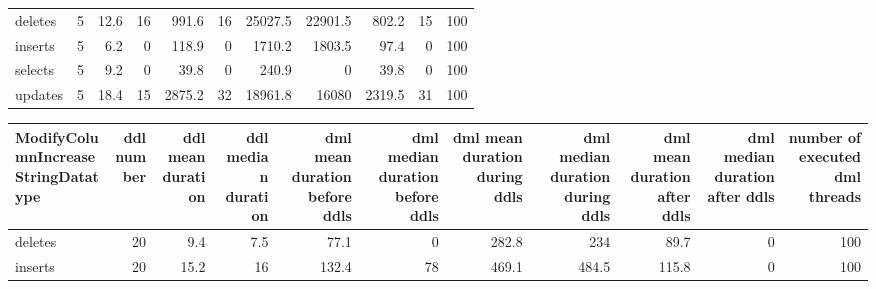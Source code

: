 \begin{tabular}{lrrrrrrrrrr}
\hline
 deletes     &            5 &                12.6 &                    16 &                           991.6 &                                16 &                         25027.5 &                           22901.5 &                          802.2 &                               15 &                              100 \\
 inserts     &            5 &                 6.2 &                     0 &                           118.9 &                                 0 &                          1710.2 &                            1803.5 &                           97.4 &                                0 &                              100 \\
 selects     &            5 &                 9.2 &                     0 &                            39.8 &                                 0 &                           240.9 &                               0   &                           39.8 &                                0 &                              100 \\
 updates     &            5 &                18.4 &                    15 &                          2875.2 &                                32 &                         18961.8 &                           16080   &                         2319.5 &                               31 &                              100 \\
\hline
\end{tabular}\begin{tabular}{lrrrrrrrrrr}
\hline
 ModifyColumnIncreaseStringDatatype   &   ddl number &   ddl mean duration &   ddl median duration &   dml mean duration before ddls &   dml median duration before ddls &   dml mean duration during ddls &   dml median duration during ddls &   dml mean duration after ddls &   dml median duration after ddls &   number of executed dml threads \\
\hline
 deletes                              &           20 &                 9.4 &                   7.5 &                            77.1 &                                 0 &                           282.8 &                             234   &                           89.7 &                                0 &                              100 \\
 inserts                              &           20 &                15.2 &                  16   &                           132.4 &                                78 &                           469.1 &                             484.5 &                          115.8 &                                0 &                              100 \\

\end{tabular}
